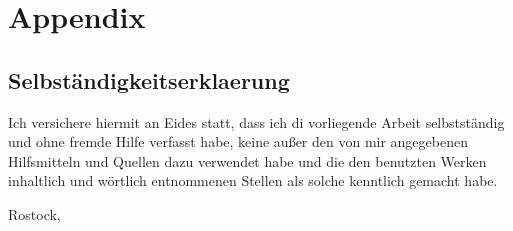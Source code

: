 \documentclass[12pt,a4paper,oneside]{book}
\begin{document}
\appendix

\chapter{Appendix}
%
%
%
%


%
\newpage
\section*{Selbst\"andigkeitserklaerung}
Ich versichere hiermit an Eides statt, dass ich di vorliegende Arbeit selbstst\"andig und ohne fremde Hilfe verfasst habe, keine au\ss er den von mir angegebenen Hilfsmitteln und Quellen dazu verwendet habe und die den benutzten Werken inhaltlich und w\"ortlich entnommenen Stellen als solche kenntlich gemacht habe.

\vspace{20mm}
\hfill Rostock, \date
\backmatter
\end{document}
